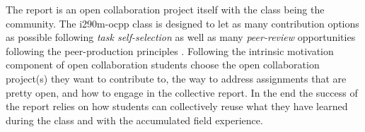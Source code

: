 \noindent The report is an open collaboration project itself with the class being the community. The i290m-ocpp class is designed to let as many contribution options as possible following {\it task self-selection} as well as many {\it peer-review} opportunities following the peer-production principles \cite{benkler2002}. Following the intrinsic motivation component of open collaboration students choose the open collaboration project(s) they want to contribute to, the way to address assignments that are pretty open, and how to engage in the collective report. In the end the success of the report relies on how students can collectively reuse what they have learned during the class and with the accumulated field experience. 


